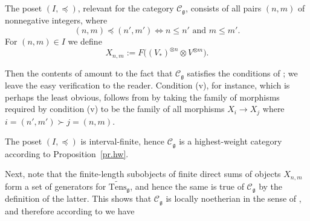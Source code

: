 \documentclass[11pt]{article}
\theoremstyle{plain}
\theoremstyle{nonumberplain}
\theoremstyle{plain}
\theoremstyle{nonumberplain}
\newcommand\cC{\mathcal C}
\newcommand\fg{\mathfrak{g}}
\begin{document}
The poset $(I,{\preceq})$, relevant for the category $\mathcal{C}_\fg$, consists of all pairs $(n,m)$ of nonnegative
integers, where
\begin{equation*}
  (n,m) {\preceq} (n',m')\iff n\le n' \text{ and } m\le m'.
\end{equation*}
{For} $(n,m)\in I$ we define 
\begin{equation*}
  X_{n,m} := F\big((V_*)^{\otimes n}\otimes V^{\otimes m}\big). 
\end{equation*}

%
%
%


Then the contents of
\cite[$\S$6]{PS1} amount to the fact that $\cC_\fg$ satisfies the
conditions of ; we leave the easy verification to the
reader. Condition (v), for instance, which is perhaps the least
obvious, follows from \cite[Lemma 6.6]{PS1} by taking the family of morphisms
required by condition (v) to be the family of all morphisms $X_i \to X_j$ where $i=(n',m') \succ j=(n,m)$.



%
%
%


The poset $(I,\preceq)$ is interval-finite, hence $\mathcal{C}_\fg$ is a highest-weight category according to Proposition~\ref{pr.hw}.  

Next, note that the finite-length subobjects of finite direct sums of objects $X_{n,m}$ form a set of
generators for {$\widetilde{\mathrm{Tens}}_\fg$}, and hence the same is true of $\cC_\fg$ by the
definition of the latter. This shows that $\cC_\fg$ is locally
noetherian in the sense of , and {therefore}
according to  we have
\end{document}
